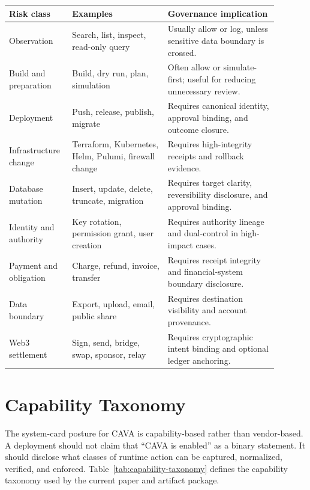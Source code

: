 \documentclass[11pt]{article}
\begin{document}
\begin{longtable}{@{}L{0.18\linewidth}L{0.33\linewidth}L{0.38\linewidth}@{}}
\toprule
Risk class & Examples & Governance implication \\
\midrule
Observation & Search, list, inspect, read-only query & Usually allow or log, unless sensitive data boundary is crossed. \\
Build and preparation & Build, dry run, plan, simulation & Often allow or simulate-first; useful for reducing unnecessary review. \\
Deployment & Push, release, publish, migrate & Requires canonical identity, approval binding, and outcome closure. \\
Infrastructure change & Terraform, Kubernetes, Helm, Pulumi, firewall change & Requires high-integrity receipts and rollback evidence. \\
Database mutation & Insert, update, delete, truncate, migration & Requires target clarity, reversibility disclosure, and approval binding. \\
Identity and authority & Key rotation, permission grant, user creation & Requires authority lineage and dual-control in high-impact cases. \\
Payment and obligation & Charge, refund, invoice, transfer & Requires receipt integrity and financial-system boundary disclosure. \\
Data boundary & Export, upload, email, public share & Requires destination visibility and account provenance. \\
Web3 settlement & Sign, send, bridge, swap, sponsor, relay & Requires cryptographic intent binding and optional ledger anchoring. \\
\bottomrule
\end{longtable}

\section{Capability Taxonomy}

The system-card posture for CAVA is capability-based rather than vendor-based. A deployment should not claim that ``CAVA is enabled'' as a binary statement. It should disclose what classes of runtime action can be captured, normalized, verified, and enforced. Table~\ref{tab:capability-taxonomy} defines the capability taxonomy used by the current paper and artifact package.
\end{document}
